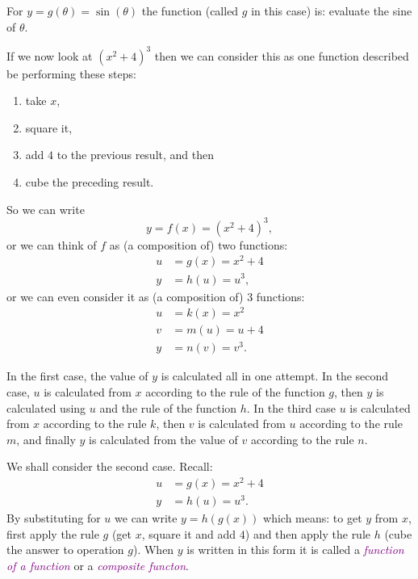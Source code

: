 \documentclass[
  english,
  11pt,
  oneside]{book}
\providecommand{\tightlist}{%
  \setlength{\itemsep}{0pt}\setlength{\parskip}{0pt}}
\newcommand{\slide}{}
\theoremstyle{definition}
\theoremstyle{definition}
\theoremstyle{definition}
\theoremstyle{definition}
\theoremstyle{remark}
\begin{document}
For \(y = g(\theta) = \sin(\theta)\) the function (called \(g\) in this case) is: evaluate the sine of \(\theta\).

If we now look at \((x^2 + 4)^3\) then we can consider this as one function described be performing these steps:

\begin{enumerate}
\def\labelenumi{\arabic{enumi}.}
\tightlist
\item
  take \(x\),
\item
  square it,
\item
  add \(4\) to the previous result, and then
\item
  cube the preceding result.
\end{enumerate}

\slide

So we can write
\[
y = f(x) = (x^2+ 4)^3,
\]
or we can think of \(f\) as (a composition of) two functions:
\begin{align*}
u &= g(x) = x^2 + 4\\
y &= h(u) = u^3,
\end{align*}
or we can even consider it as (a composition of) 3 functions:
\begin{align*}
u &= k(x) = x^2\\
v &= m(u) = u + 4\\
y &= n(v) = v^3.
\end{align*}
\slide
In the first case, the value of \(y\) is calculated all in one attempt. In the second case, \(u\) is calculated from \(x\) according to the rule of the function \(g\), then \(y\) is calculated using \(u\) and the rule of the function \(h\). In the third case \(u\) is calculated from \(x\) according to the rule \(k\), then \(v\) is calculated from \(u\) according to the rule \(m\), and finally \(y\) is calculated from the value of \(v\) according to the rule \(n\).

We shall consider the second case. Recall:
\begin{align*}
u &= g(x) = x^2+ 4\\
y &= h(u) = u^3.
\end{align*}
By substituting for \(u\) we can write \(y = h(g(x))\) which means: to get \(y\) from \(x\), first apply the rule \(g\) (get \(x\), square it and add \(4\)) and then apply the rule \(h\) (cube the answer to operation \(g\)). When \(y\) is written in this form it is called a \textcolor{purple}{\em function of a function} or a \textcolor{purple}{\em composite functon}.
\slide
\end{document}
